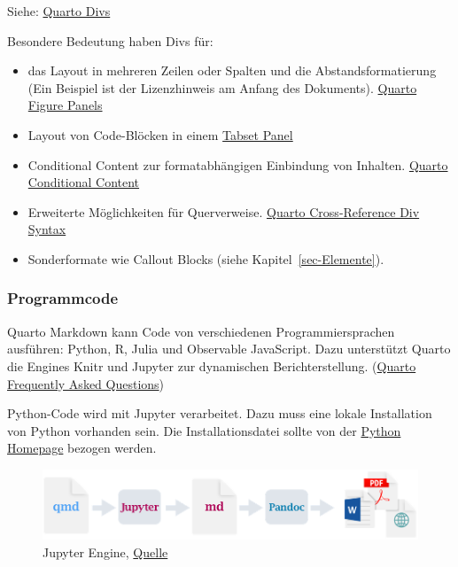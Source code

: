 \documentclass[
  letterpaper,
  DIV=11]{scrartcl}
\begin{document}
Siehe:
\href{https://quarto.org/docs/authoring/markdown-basics.html\#divs-and-spans}{Quarto
Divs}

Besondere Bedeutung haben Divs für:

\begin{itemize}
\item
  das Layout in mehreren Zeilen oder Spalten und die
  Abstandsformatierung (Ein Beispiel ist der Lizenzhinweis am Anfang des
  Dokuments).
  \href{https://quarto.org/docs/authoring/figures.html\#figure-panels}{Quarto
  Figure Panels}
\item
  Layout von Code-Blöcken in einem
  \href{https://quarto.org/docs/interactive/layout.html\#tabset-panel}{Tabset
  Panel}
\item
  Conditional Content zur formatabhängigen Einbindung von Inhalten.
  \href{https://quarto.org/docs/authoring/conditional.html}{Quarto
  Conditional Content}
\item
  Erweiterte Möglichkeiten für Querverweise.
  \href{https://quarto.org/docs/authoring/cross-references-divs.html}{Quarto
  Cross-Reference Div Syntax}
\item
  Sonderformate wie Callout Blocks (siehe Kapitel~\ref{sec-Elemente}).
\end{itemize}

\subsubsection{Programmcode}\label{programmcode}

Quarto Markdown kann Code von verschiedenen Programmiersprachen
ausführen: Python, R, Julia und Observable JavaScript. Dazu unterstützt
Quarto die Engines Knitr und Jupyter zur dynamischen Berichterstellung.
(\href{https://quarto.org/docs/faq/\#what-programming-languages-are-supported-in-quarto}{Quarto
Frequently Asked Questions})

Python-Code wird mit Jupyter verarbeitet. Dazu muss eine lokale
Installation von Python vorhanden sein. Die Installationsdatei sollte
von der \href{https://www.python.org/downloads/}{Python Homepage}
bezogen werden.

\begin{figure}[H]

{\centering \includegraphics{skript/00-bilder/Renderpfad_Jupyter.png}

}

\caption{Jupyter Engine,
\href{https://quarto.org/docs/get-started/hello/vscode.html\#how-it-works}{Quelle}}

\end{figure}%
\end{document}
